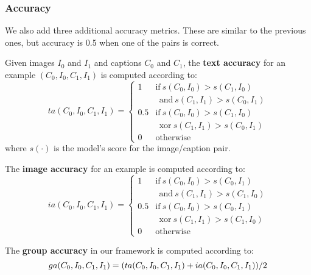 \subsubsection{Accuracy}

We also add three additional accuracy metrics. These are similar to the previous ones, but accuracy is 0.5 when one of the pairs is correct.

Given images $I_0$ and $I_{1}$ and captions $C_{0}$ and $C_{1}$, the \textbf{text accuracy} for an example $(C_{0},I_{0},C_{1},I_{1})$ is computed according to:
\begin{equation}\label{eq:text-accuracy}
        ta(C_{0},I_{0},C_{1},I_{1})= 
    \begin{cases}
        1 & \text{if}\  s(C_{0}, I_{0}) > s(C_{1}, I_{0}) \\
        & \ \ \text{and}\ s(C_{1}, I_{1}) > s(C_{0}, I_{1}) \\
        0.5 & \text{if}\  s(C_{0}, I_{0}) > s(C_{1}, I_{0}) \\
        & \ \ \text{xor}\ s(C_{1}, I_{1}) > s(C_{0}, I_{1}) \\
        0              & \text{otherwise}
    \end{cases}
\end{equation}
where $s(\cdot)$ is the model's score for the image/caption pair.

The \textbf{image accuracy} for an example is computed according to:
\begin{equation}\label{eq:image-accuracy}
        ia(C_{0},I_{0},C_{1},I_{1})= 
    \begin{cases}
        1 & \text{if}\  s(C_{0}, I_{0}) > s(C_{0}, I_{1})\\
        & \ \ \text{and}\ s(C_{1}, I_{1}) > s(C_{1}, I_{0}) \\
        0.5 & \text{if}\  s(C_{0}, I_{0}) > s(C_{0}, I_{1})\\
        & \ \ \text{xor}\ s(C_{1}, I_{1}) > s(C_{1}, I_{0}) \\
        0              & \text{otherwise}
    \end{cases}
\end{equation}

The \textbf{group accuracy} in our framework is computed according to:
\begin{equation}\label{eq:group-accuracy}
        ga(C_{0},I_{0},C_{1},I_{1})= 
        (ta(C_{0},I_{0},C_{1},I_{1}) + ia(C_{0},I_{0},C_{1},I_{1})) / 2\\
\end{equation}

